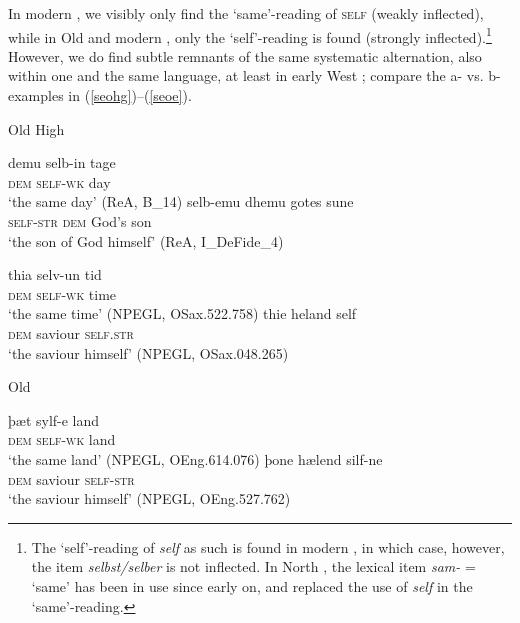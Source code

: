 \documentclass[output=paper,colorlinks,citecolor=brown]{langscibook}
\begin{document}
In modern , we visibly only find the `same'-reading  of \textsc{self} (weakly inflected), while in Old  and modern , only the `self'-reading is found (strongly inflected).\footnote{The `self'-reading of \textit{self} as such is found in modern , in which case, however, the item \textit{selbst/selber} is not inflected. 
In North , the lexical item \textit{sam-} = `same' has been in use since early on, and replaced the use of \textit{self} in the `same'-reading. } However, we do find subtle remnants of the same systematic alternation, also within one and the same language, at least in early West ; compare the a- vs. b-examples in (\ref{seohg})--(\ref{seoe}).

\begin{exe}
  \ex  \label{seohg}  Old High 
     \begin{xlist}
    \ex  \gll   demu selb-in tage \\ 
       \textsc{dem} \textsc{self-wk}   day      \ \      \\
        \glt `the same day' (ReA, B\_14)       
    \ex \gll selb-emu dhemu {gotes sune} \\  
      \textsc{self-str}  \textsc{dem}   {God's son}    \ \      \\   
        \glt `the son of God himself' (ReA, I\_DeFide\_4)   
     \end{xlist}

  \ex  \label{seos} 
     \begin{xlist}
        \ex \gll  thia  selv-un   tid   \\  
        \textsc{dem}  \textsc{self-wk}   time     \ \      \\ 
        \glt `the same time' (NPEGL, OSax.522.758)              
    \ex \gll thie  heland   self \\  
     \textsc{dem}   saviour   \textsc{self.str}      \ \   \\
        \glt `the saviour himself' (NPEGL, OSax.048.265)
     \end{xlist}

  \ex  \label{seoe}  Old 
     \begin{xlist}
    \ex  \gll  þæt sylf-e land  \\  %
      \textsc{dem}   \textsc{self-wk} land  \ \     \\ %
        \glt `the same land' (NPEGL, OEng.614.076)
     \ex \gll  þone hælend  silf-ne  \\ 
       \textsc{dem} saviour  \textsc{self-str} \ \    \\ 
        \glt `the saviour himself' (NPEGL, OEng.527.762)
     \end{xlist}
\end{exe}
\end{document}
